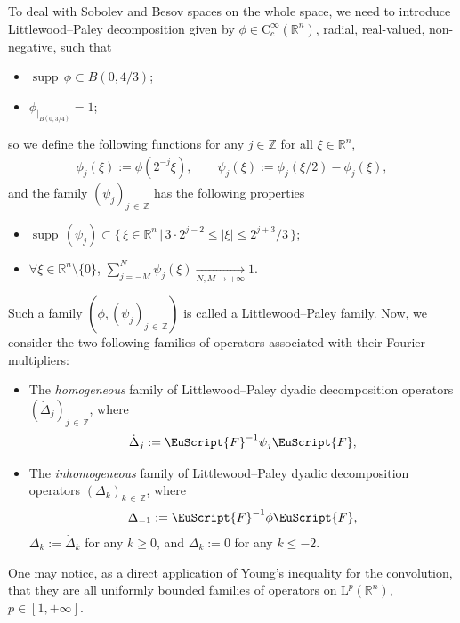 \documentclass[10pt]{amsart}
\theoremstyle{definition}\newtheorem{defi}[theo]{Definition}\newtheorem{rema}[theo]{Remark}\newtheorem{exam}[theo]{Example}\newtheorem{exem}[theo]{Example}\newtheorem{nota}[theo]{Notation}
\DeclareMathOperator{\supp}{supp\,}
\newcommand{\bbR}{\mathbb{R}}
\newcommand{\bbZ}{\mathbb{Z}}
\newcommand{\rmL}{\mathrm{L}}
\newcommand{\rmC}{\mathrm{C}}
\newcommand{\eus}{\EuScript}
\let\oldforall\forall
\renewcommand*{\forall}{\mathrel{\oldforall}}
\begin{document}
To deal with Sobolev and Besov spaces on the whole space, we need to introduce Littlewood--Paley decomposition given by $\phi\in \rmC_c^\infty(\bbR^n)$, radial, real-valued, non-negative, such that
\begin{itemize}
\item $\supp \phi \subset B(0,4/3)$;
\item ${\phi}_{|_{B(0,3/4)}}=1$;
\end{itemize}
so we define the following functions for any $j\in\bbZ$ for all $\xi\in\bbR^n$,
\begin{align*}
\phi_j(\xi):=\phi\left(2^{-j}\xi\right),\qquad \psi_j(\xi):= \phi_{j}(\xi/2)-\phi_{j}(\xi),
\end{align*}
and the family $(\psi_j)_{j\,\in\,\bbZ}$ has the following properties
\begin{itemize}
\item $\supp(\psi_j)\subset \{\,\xi\in\bbR^n\,|\,3\cdot 2^{j-2}\leqslant\left|{\xi}\right| \leqslant 2^{j+3}/3\,\}$;
\item $\forall\xi\in\bbR^n\setminus\{0\}$, $\sum_{j=-M}^N{\psi_j}(\xi)\xrightarrow[N,M\rightarrow+\infty]{} 1$.
\end{itemize}
Such a family $(\phi,(\psi_j)_{j\,\in\,\bbZ})$ is called a Littlewood--Paley family. Now, we consider the two following families of operators associated with their Fourier multipliers:
\begin{itemize}
\item The \emph{homogeneous} family of Littlewood--Paley dyadic decomposition operators $(\dot{\Delta}_j)_{j\,\in\,\bbZ}$, where
\begin{align*}
\dot{\Delta}_j:= \eus{F}^{-1}\psi_j\eus{F},
\end{align*}
\item The \emph{inhomogeneous} family of Littlewood--Paley dyadic decomposition operators $({\Delta}_k)_{k\,\in\,\bbZ}$, where
\begin{align*}
{\Delta}_{-1}:= \eus{F}^{-1}\phi\eus{F},
\end{align*}
$\Delta_k:=\dot{\Delta}_k$ for any $k\geqslant 0$, and $\Delta_k:=0$ for any $k\leqslant-2$.
\end{itemize}
One may notice, as a direct application of Young's inequality for the convolution, that they are all uniformly bounded families of operators on $\rmL^p(\bbR^n)$,
$p\in[1,+\infty]$.
\end{document}
